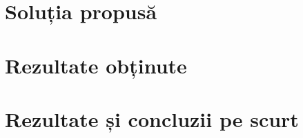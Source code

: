 


\section{Soluția propusă}
\label{sec:proj}

\section{Rezultate obținute}
\label{sec:proj}

\section{Rezultate și concluzii pe scurt}
\label{sec:proj}

